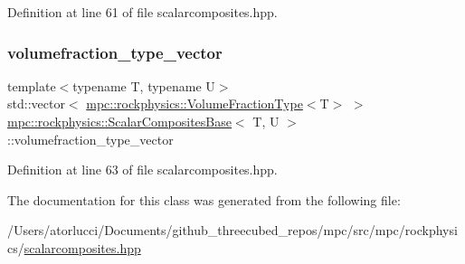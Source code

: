 Definition at line 61 of file scalarcomposites.\+hpp.

\mbox{\label{classmpc_1_1rockphysics_1_1_scalar_composites_base_a7b14158ca347b93da4c97cbcdfaa9e31}} 
\subsubsection{\texorpdfstring{volumefraction\+\_\+type\+\_\+vector}{volumefraction\_type\_vector}}
{\footnotesize\ttfamily template$<$typename T, typename U$>$ \\
std\+::vector$<$ \mbox{\hyperlink{structmpc_1_1rockphysics_1_1_volume_fraction_type}{mpc\+::rockphysics\+::\+Volume\+Fraction\+Type}}$<$T$>$ $>$ \mbox{\hyperlink{classmpc_1_1rockphysics_1_1_scalar_composites_base}{mpc\+::rockphysics\+::\+Scalar\+Composites\+Base}}$<$ T, U $>$\+::volumefraction\+\_\+type\+\_\+vector\hspace{0.3cm}{\ttfamily [protected]}}



Definition at line 63 of file scalarcomposites.\+hpp.



The documentation for this class was generated from the following file\+:\begin{DoxyCompactItemize}
\item 
/\+Users/atorlucci/\+Documents/github\+\_\+threecubed\+\_\+repos/mpc/src/mpc/rockphysics/\mbox{\hyperlink{scalarcomposites_8hpp}{scalarcomposites.\+hpp}}\end{DoxyCompactItemize}
